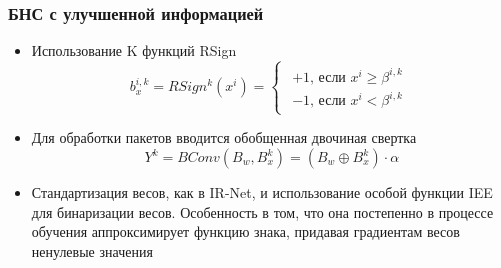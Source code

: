 \documentclass[usenames,dvipsnames, 10pt]{beamer}
\begin{document}
\begin{frame}
\frametitle{БНС с улучшенной информацией}
\begin{itemize}
	\item Использование K функций RSign
                \begin{equation*}
                    b_x^{i,k} = RSign^{k}(x^{i}) =
                    \begin{cases}
                    \begin{aligned}
                        +1 \text{, если } x^{i} \geq \beta^{i,k}
                        \\ -1 \text{, если } x^{i} < \beta^{i,k}
                    \end{aligned}
                    \end{cases}
                \end{equation*}
        \item Для обработки пакетов вводится обобщенная двочиная свертка
                \begin{equation*}
                Y^k = BConv (B_w, B_x^k) = (B_w \oplus B_x^k) \cdot  \alpha
                \end{equation*}
	\item Стандартизация весов, как в IR-Net, и использование особой           функции IEE для бинаризации весов. Особенность в том, что она             постепенно в процессе обучения аппроксимирует функцию знака,           придавая градиентам весов ненулевые значения
            \vskip 0.2cm
            \begin{figure}[h!]
            \label{image:IEE}
            \end{figure}
\end{itemize}
\end{frame}
\end{document}
